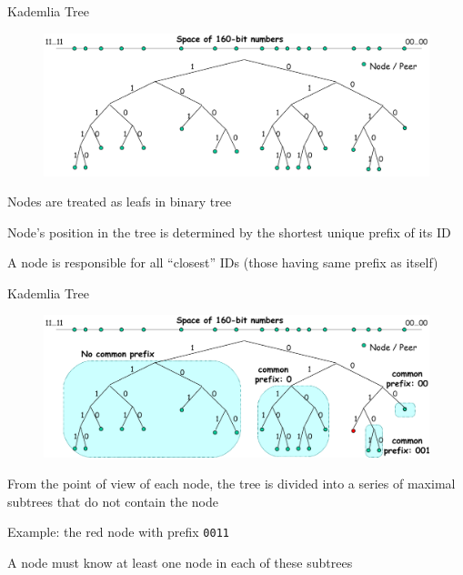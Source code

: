 \begin{frame}[t]{Kademlia Tree}

\begin{figure}
	\includegraphics[width=\textwidth]{figs/10/kad1}
\end{figure}

\BI
\item Nodes are treated as leafs in binary tree
\item Node's position in the tree is determined by the \alert{shortest unique} prefix of its ID
\item A node is responsible for all “closest” IDs (those having same prefix as itself)
\EI

\end{frame}

\begin{frame}[t]{Kademlia Tree}

\begin{figure}
	\includegraphics[width=\textwidth]{figs/10/kad2}
\end{figure}

\BI
\item From the point of view of each node, the tree is divided into a series of maximal subtrees that do not contain the node
\item Example: the red node with prefix \texttt{0011}
\item A node must know at least one node in each of these subtrees
\EI

\end{frame}

